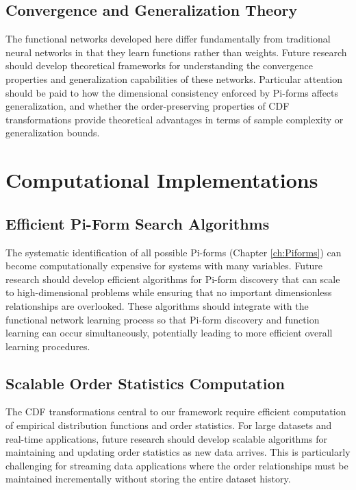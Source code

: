 \documentclass[
	11pt, %
	fleqn, %
	a4paper, %
]{LegrandOrangeBook}
\begin{document}
\subsection{Convergence and Generalization Theory}
The functional networks developed here differ fundamentally from traditional neural networks in that they learn functions rather than weights. Future research should develop theoretical frameworks for understanding the convergence properties and generalization capabilities of these networks.
Particular attention should be paid to how the dimensional consistency enforced by Pi-forms affects generalization, and whether the order-preserving properties of CDF transformations provide theoretical advantages in terms of sample complexity or generalization bounds.

\section{Computational Implementations}
\subsection{Efficient Pi-Form Search Algorithms}
The systematic identification of all possible Pi-forms (Chapter \ref{ch:Piforms}) can become computationally expensive for systems with many variables. Future research should develop efficient algorithms for Pi-form discovery that can scale to high-dimensional problems while ensuring that no important dimensionless relationships are overlooked.
These algorithms should integrate with the functional network learning process so that Pi-form discovery and function learning can occur simultaneously, potentially leading to more efficient overall learning procedures.

\subsection{Scalable Order Statistics Computation}
The CDF transformations central to our framework require efficient computation of empirical distribution functions and order statistics. For large datasets and real-time applications, future research should develop scalable algorithms for maintaining and updating order statistics as new data arrives.
This is particularly challenging for streaming data applications where the order relationships must be maintained incrementally without storing the entire dataset history.
\end{document}
